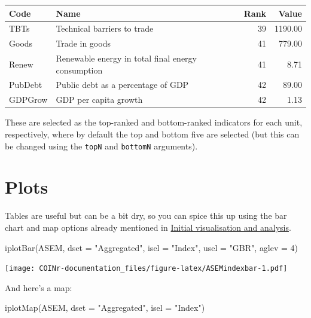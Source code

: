 \documentclass[
]{book}
\newenvironment{Shaded}{\begin{snugshade}}{\end{snugshade}}
\newcommand{\AttributeTok}[1]{\textcolor[rgb]{0.77,0.63,0.00}{#1}}
\newcommand{\DecValTok}[1]{\textcolor[rgb]{0.00,0.00,0.81}{#1}}
\newcommand{\FunctionTok}[1]{\textcolor[rgb]{0.00,0.00,0.00}{#1}}
\newcommand{\NormalTok}[1]{#1}
\newcommand{\StringTok}[1]{\textcolor[rgb]{0.31,0.60,0.02}{#1}}
\begin{document}
\begin{tabular}{l|l|r|r}
\hline
Code & Name & Rank & Value\\
\hline
TBTs & Technical barriers to trade & 39 & 1190.00\\
\hline
Goods & Trade in goods & 41 & 779.00\\
\hline
Renew & Renewable energy in total final energy consumption & 41 & 8.71\\
\hline
PubDebt & Public debt as a percentage of GDP & 42 & 89.00\\
\hline
GDPGrow & GDP per capita growth & 42 & 1.13\\
\hline
\end{tabular}

These are selected as the top-ranked and bottom-ranked indicators for each unit, respectively, where by default the top and bottom five are selected (but this can be changed using the \texttt{topN} and \texttt{bottomN} arguments).

\hypertarget{plots}{%
\section{Plots}\label{plots}}

Tables are useful but can be a bit dry, so you can spice this up using the bar chart and map options already mentioned in \protect\hyperlink{initial-visualisation-and-analysis}{Initial visualisation and analysis}.

\begin{Shaded}
\begin{Highlighting}[]
\FunctionTok{iplotBar}\NormalTok{(ASEM, }\AttributeTok{dset =} \StringTok{"Aggregated"}\NormalTok{, }\AttributeTok{isel =} \StringTok{"Index"}\NormalTok{, }\AttributeTok{usel =} \StringTok{"GBR"}\NormalTok{, }\AttributeTok{aglev =} \DecValTok{4}\NormalTok{)}
\end{Highlighting}
\end{Shaded}

\texttt{[image: COINr-documentation\_files/figure-latex/ASEMindexbar-1.pdf]}

And here's a map:

\begin{Shaded}
\begin{Highlighting}[]
\FunctionTok{iplotMap}\NormalTok{(ASEM, }\AttributeTok{dset =} \StringTok{"Aggregated"}\NormalTok{, }\AttributeTok{isel =} \StringTok{"Index"}\NormalTok{)}
\end{Highlighting}
\end{Shaded}
\end{document}
